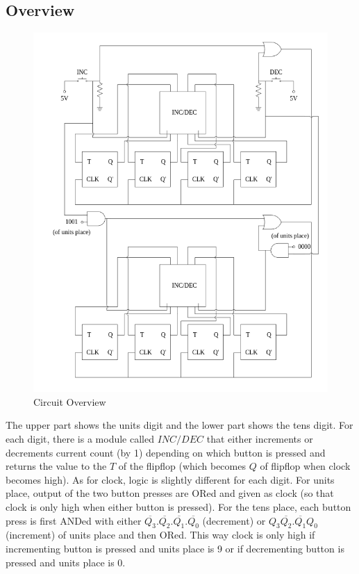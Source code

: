 \documentclass{article}
\begin{document}
\subsection{Overview}
\begin{figure}[h!]
    \centering
    \includegraphics[width=1\linewidth]{figs/overview.png}
    \caption{Circuit Overview}
    \label{fig:enter-label}
\end{figure}
The upper part shows the units digit and the lower part shows the tens digit. For each digit, there is a module called $INC/DEC$ that either increments or decrements current count (by 1) depending on which button is pressed and returns the value to the $T$ of the flipflop (which becomes $Q$ of flipflop when clock becomes high). As for clock, logic is slightly different for each digit. For units place, output of the two button presses are ORed and given as clock (so that clock is only high when either button is pressed). For the tens place, each button press is first ANDed with either $\overline{Q_3}.\overline{Q_2}.\overline{Q_1}.\overline{Q_0}$ (decrement) or $Q_3\overline{Q_2}.\overline{Q_1}Q_0$ (increment) of units place and then ORed. This way clock is only high if incrementing button is pressed and units place is 9 or if decrementing button is pressed and units place is 0.
\end{document}
